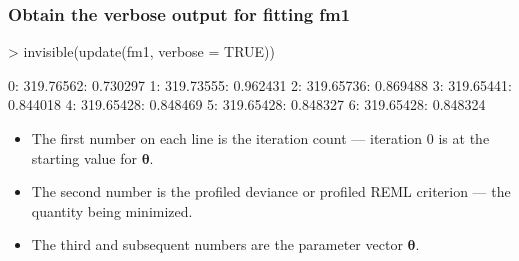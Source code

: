 \begin{frame}[fragile]
  \frametitle{Obtain the verbose output for fitting fm1}
\begin{Schunk}
\begin{Sinput}
> invisible(update(fm1, verbose = TRUE))
\end{Sinput}
\begin{Soutput}
  0:     319.76562: 0.730297
  1:     319.73555: 0.962431
  2:     319.65736: 0.869488
  3:     319.65441: 0.844018
  4:     319.65428: 0.848469
  5:     319.65428: 0.848327
  6:     319.65428: 0.848324
\end{Soutput}
\end{Schunk}
\begin{itemize}
\item The first number on each line is the iteration count --- iteration
  0 is at the starting value for $\bm\theta$.
\item The second number is the profiled deviance or profiled REML
  criterion --- the quantity being minimized.
\item The third and subsequent numbers are the parameter vector $\bm\theta$.
\end{itemize}
\end{frame}

